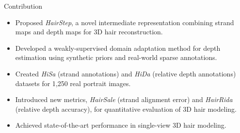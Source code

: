 
\begin{frame}[t]{Contribution}
    \begin{itemize}
        \item Proposed \emph{HairStep}, a novel intermediate representation combining strand maps and depth maps for 3D hair reconstruction.
        \item Developed a weakly-supervised domain adaptation method for depth estimation using synthetic priors and real-world sparse annotations.
        \item Created \emph{HiSa} (strand annotations) and \emph{HiDa} (relative depth annotations) datasets for 1,250 real portrait images.
        \item Introduced new metrics, \emph{HairSale} (strand alignment error) and \emph{HairRida} (relative depth accuracy), for quantitative evaluation of 3D hair modeling.
        \item Achieved state-of-the-art performance in single-view 3D hair modeling.
    \end{itemize}
\end{frame}